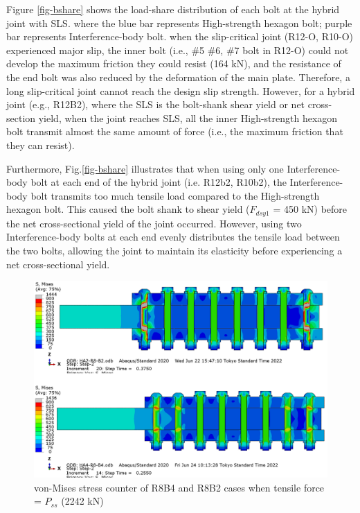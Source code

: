 Figure \ref{fig-bshare} shows the load-share distribution of each bolt at the hybrid joint with SLS. where the blue bar represents High-strength hexagon bolt; purple bar represents Interference-body bolt. when the slip-critical joint (R12-O, R10-O) experienced major slip, the inner bolt (i.e., \#5 \#6, \#7 bolt in R12-O) could not develop the maximum friction they could resist (164 kN), and the resistance of the end bolt was also reduced by the deformation of the main plate. Therefore, a long slip-critical joint cannot reach the design slip strength. However, for a hybrid joint (e.g., R12B2), where the SLS is the bolt-shank shear yield or net cross-section yield, when the joint reaches SLS, all the inner High-strength hexagon bolt transmit almost the same amount of force (i.e., the maximum friction that they can resist). 

Furthermore, Fig.\ref{fig-bshare} illustrates that when using only one Interference-body bolt at each end of the hybrid joint (i.e. R12b2, R10b2), the Interference-body bolt transmits too much tensile load compared to the High-strength hexagon bolt. This caused the bolt shank to shear yield ($F_{dsy1}$ = 450 kN) before the net cross-sectional yield of the joint occurred. However, using two Interference-body bolts at each end evenly distributes the tensile load between the two bolts, allowing the joint to maintain its elasticity before experiencing a net cross-sectional yield.


\begin{figure}[htbp]
    \centering
    \includegraphics[width=0.9\linewidth]{imgs/ch5/r8b24misescs0-1940.png}
    \caption{von-Mises stress counter of R8B4 and R8B2 cases when tensile force = $P_{ss}$ (2242 kN)}
    \label{fig-r10b24boltmises}
\end{figure}

